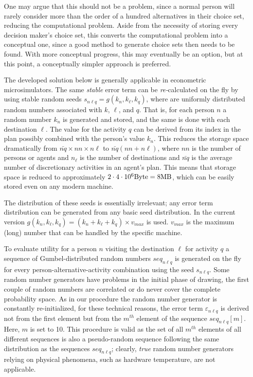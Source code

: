 One may argue that this should not be a problem, since a normal person will rarely consider more than the order of a hundred alternatives in their choice set, reducing the computational problem. Aside from the necessity of storing every decision maker's choice set, this converts the computational problem into a conceptual one, since a good method to generate choice sets then needs to be found. 
With more conceptual progress, this may eventually be an option, but at this point, a conceptually simpler approach is preferred.

The developed solution below is generally applicable in econometric microsimulators. The same \emph{stable} error term can be \emph{re-}calculated on the fly by using stable random seeds $s_{n\ell q} = g(k_n, k_\ell, k_q)$, where are uniformly distributed random numbers associated with $k$, $\ell$, and $q$. 
That is, for each person $n$ a random number $k_n$ is generated and stored, and the same is done with each destination $\ell$. 
The value for the activity $q$ can be derived from its index in the plan possibly combined with the person's value $k_n$. 
This reduces the storage space dramatically from $\bar{nq} \times nn \times n\ell$ to $\bar{nq}(nn + n\ell)$, where $nn$ is the number of persons or agents and $n_\ell$ is the number of destinations and $\bar{nq}$ is the average number of discretionary activities in an agent's plan. 
This means that storage space is reduced to approximately $2 \cdot 4 \cdot 10^{6} \hbox{Byte} = 8 \hbox{MB}$, which can be easily stored even on any modern machine.

The distribution of these seeds is essentially irrelevant; any error term distribution can be generated from any basic seed distribution. 
In the current version $g(k_n, k_\ell, k_q) = (k_n + k_\ell + k_q) \times v_{max}$ is used. $v_{max}$ is the maximum (long) number that can be handled by the specific machine.

To evaluate utility for a person $n$ visiting the destination $\ell$ for activity $q$ a sequence of Gumbel-distributed random numbers $seq_{n\ell q}$ is generated on the fly for every person-alternative-activity combination using the seed $s_{n\ell q}$. 
Some random number generators have problems in the initial phase of drawing, \eg the first couple of random numbers are correlated or do never cover the complete probability space. As in our procedure the random number generator is constantly re-initialized, for these technical reasons, the error term $\varepsilon_{n\ell q}$ is derived not from the first element but from the $m^{th}$ element of the sequence $seq_{n\ell q}[m]$. 
Here, $m$ is set to 10. 
This procedure is valid as the set of all  $m^{th}$ elements of all different sequences is also a pseudo-random sequence following the same distribution as the sequences $seq_{n\ell q}$; clearly, \emph{true} random number generators relying on physical phenomena, such as hardware temperature, are not applicable. 

